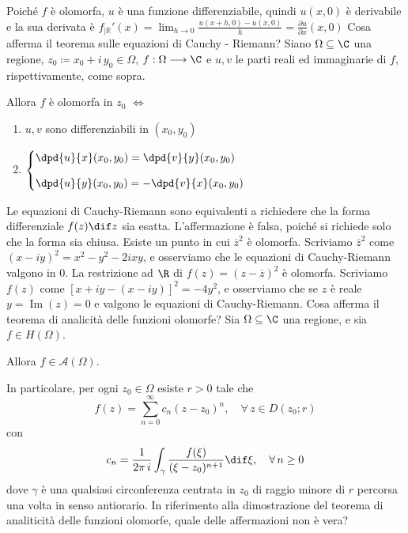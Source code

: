     Poiché $f$ è olomorfa, $u$ è una funzione differenziabile, quindi $u(x,0)$ è derivabile e la sua derivata è 
    $f_{| \mathbb{R}}'(x) = \lim_{h \to 0} \frac{u(x+h,0) - u(x,0)}{h} = \frac{\partial u}{\partial x}(x,0)$
    Cosa afferma il teorema sulle equazioni di Cauchy - Riemann?
Siano $ \Omega \subseteq \C $ una regione, $ z_0 \coloneqq x_0+i\,y_0 \in \Omega $, $ f:\Omega\longrightarrow \C $ e $ u,v $ le parti reali ed immaginarie di $ f $, rispettivamente, come sopra.

Allora $ f $ è olomorfa in $ z_0 $ $ \iff $ 
\begin{enumerate}
    \item $ u,v $ sono differenziabili in $ (x_0,y_0) $
    \item $ \displaystyle \begin{cases}
        \dpd{u}{x}(x_0,y_0) = \dpd{v}{y}(x_0,y_0)\\[2ex]
        \dpd{u}{y}(x_0,y_0) = -\dpd{v}{x}(x_0,y_0)
    \end{cases} $
\end{enumerate}
Le equazioni di Cauchy-Riemann sono equivalenti a richiedere che la forma differenziale $f(z) \dif z$ sia esatta.
    L'affermazione è falsa, poiché si richiede solo che la forma sia chiusa.
Esiste un punto in cui $\overline{z}^2$ è olomorfa.
Scriviamo $\overline{z}^2$ come $(x-iy)^2=x^2-y^2-2ixy$, e osserviamo che le equazioni di Cauchy-Riemann valgono in $0$.
    La restrizione ad $ \R $ di $f(z)=(z-\overline{z})^2$ è olomorfa.
Scriviamo $f(z)$ come $[x+iy-(x-iy)]^2=-4y^2$, e osserviamo che se $ z $ è reale $y=\operatorname{Im}(z)=0$ e valgono le equazioni di Cauchy-Riemann.
    Cosa afferma il teorema di analicità delle funzioni olomorfe?
    Sia $\Omega \subseteq \C$ una regione, e sia $ f \in H(\Omega) $. 
        
    Allora $ f \in \mathcal{A}(\Omega) $. 

    In particolare, per ogni $ z_0 \in \Omega$ esiste $ r>0 $ tale che \[
        f(z)= \displaystyle \sum_{n=0}^{\infty} c_{n}(z-z_0)^{n},\quad \forall\, z \in D(z_0;r) 
    \]con \[
        c_{n}=\frac{1}{2\pi\,i} \int_{\gamma} \frac{f(\xi)}{(\xi-z_0)^{n+1}}\dif \xi ,\quad \forall\, n\ge 0  
    \]dove $\gamma$ è una qualsiasi circonferenza centrata in $ z_0 $ di raggio minore di $ r $ percorsa una volta in senso antiorario.
    In riferimento alla dimostrazione del teorema di analiticità delle funzioni olomorfe, quale delle affermazioni non è vera?

